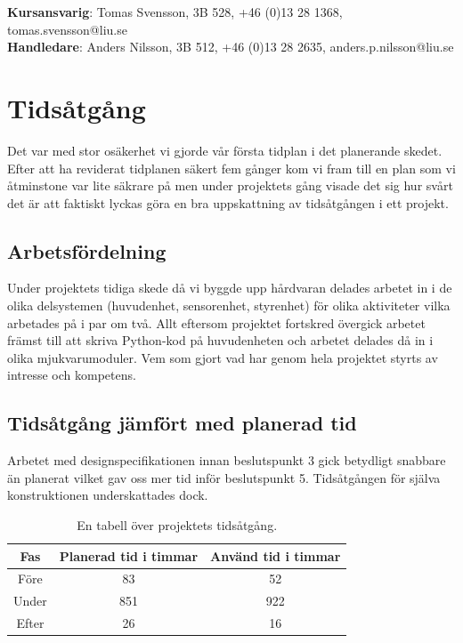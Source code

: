 \documentclass{article}
\begin{document}
\begin{center}
\textbf{Kursansvarig}: Tomas Svensson, 3B 528, +46 (0)13 28 1368, tomas.svensson@liu.se \\
\textbf{Handledare}: Anders Nilsson, 3B 512, +46 (0)13 28 2635, anders.p.nilsson@liu.se
\end{center}
\vspace*{\fill}
\clearpage

\renewcommand*\contentsname{Innehållsförteckning}
\tableofcontents

\clearpage
\section{Tidsåtgång}
Det var med stor osäkerhet vi gjorde vår första tidplan i det planerande skedet. Efter att ha reviderat tidplanen säkert fem gånger kom vi fram till en plan som vi åtminstone var lite säkrare på men under projektets gång visade det sig hur svårt det är att faktiskt lyckas göra en bra uppskattning av tidsåtgången i ett projekt.

\subsection{Arbetsfördelning}
Under projektets tidiga skede då vi byggde upp hårdvaran delades arbetet in i de olika delsystemen (huvudenhet, sensorenhet, styrenhet) för olika aktiviteter vilka arbetades på i par om två. Allt eftersom projektet fortskred övergick arbetet främst till att skriva Python-kod på huvudenheten och arbetet delades då in i olika mjukvarumoduler. Vem som gjort vad har genom hela projektet styrts av intresse och kompetens.

\subsection{Tidsåtgång jämfört med planerad tid}
Arbetet med designspecifikationen innan beslutspunkt 3 gick betydligt snabbare än planerat vilket gav oss mer tid inför beslutspunkt 5. Tidsåtgången för själva konstruktionen underskattades dock.

\begin{table}[H]
\centering
\caption{En tabell över projektets tidsåtgång.}
\begin{tabular}{ | c | c | c | }
\hline
Fas & Planerad tid i timmar & Använd tid i timmar \\
\hline
Före & 83 & 52 \\
\hline
Under & 851 & 922 \\
\hline
Efter & 26 & 16 \\
\hline
\end{tabular}
\label{table:tidsatgang}
\end{table}
\ \\
\end{document}
